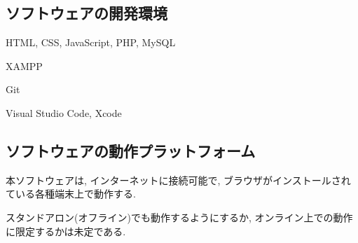 \documentclass[11ptm]{jsarticle}
\begin{document}
\subsection{ソフトウェアの開発環境}
\label{subsec:ソフトウェアの開発環境}
\begin{description}[labelwidth=9em]
  \item[使用言語] HTML, CSS, JavaScript, PHP, MySQL
  \item[使用フレームワーク] XAMPP
  \item[使用ミドルウェア] Git
  \item[使用開発環境] Visual Studio Code, Xcode
\end{description}

\subsection{ソフトウェアの動作プラットフォーム}
\label{subsec:ソフトウェアの動作プラットフォーム}
本ソフトウェアは, インターネットに接続可能で, ブラウザがインストールされている各種端末上で動作する. \par
スタンドアロン(オフライン)でも動作するようにするか, オンライン上での動作に限定するかは未定である.


\newpage
\end{document}
